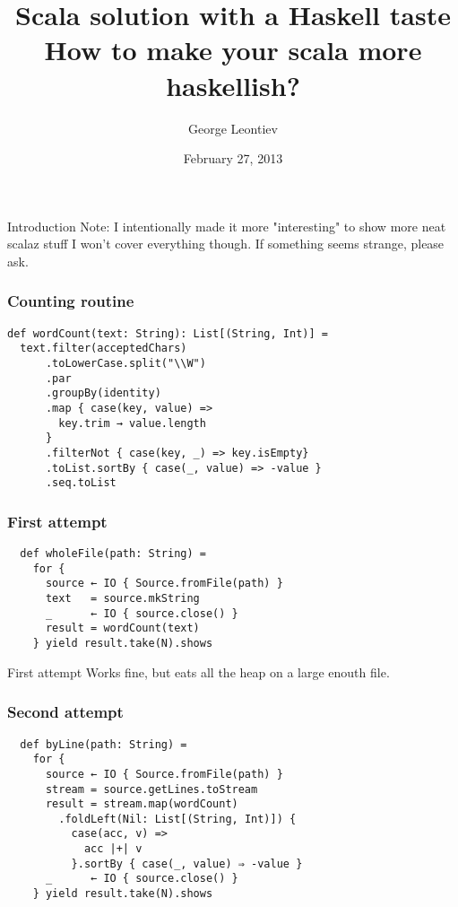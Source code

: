 \documentclass{beamer}
\title[Scala solution with a Haskell taste]{Scala solution with a Haskell taste\\How to make your scala more haskellish?}
\author{George Leontiev}
\institute{folone.info}
\date{February 27, 2013}
\begin{document}
\begin{frame}
\titlepage
\end{frame}


\begin{frame}{Introduction}
  Note: I intentionally made it more "interesting" to show more neat scalaz stuff\newline
  I won't cover everything though. If something seems strange, please ask.
\end{frame}

\begin{frame}[fragile]
\frametitle{Counting routine}
\begin{lstlisting}
def wordCount(text: String): List[(String, Int)] =
  text.filter(acceptedChars)
      .toLowerCase.split("\\W")
      .par
      .groupBy(identity)
      .map { case(key, value) =>
        key.trim → value.length
      }
      .filterNot { case(key, _) => key.isEmpty}
      .toList.sortBy { case(_, value) => -value }
      .seq.toList
\end{lstlisting}
\end{frame}

\begin{frame}[fragile]
\frametitle{First attempt}
\begin{lstlisting}
  def wholeFile(path: String) =
    for {
      source ← IO { Source.fromFile(path) }
      text   = source.mkString
      _      ← IO { source.close() }
      result = wordCount(text)
    } yield result.take(N).shows
\end{lstlisting}
\end{frame}

\begin{frame}{First attempt}
  Works fine, but eats all the heap on a large enouth file.
\end{frame}

\begin{frame}[fragile]
\frametitle{Second attempt}
\begin{lstlisting}
  def byLine(path: String) =
    for {
      source ← IO { Source.fromFile(path) }
      stream = source.getLines.toStream
      result = stream.map(wordCount)
        .foldLeft(Nil: List[(String, Int)]) {
          case(acc, v) =>
            acc |+| v
          }.sortBy { case(_, value) ⇒ -value }
      _      ← IO { source.close() }
    } yield result.take(N).shows
\end{lstlisting}
\end{frame}
\end{document}
